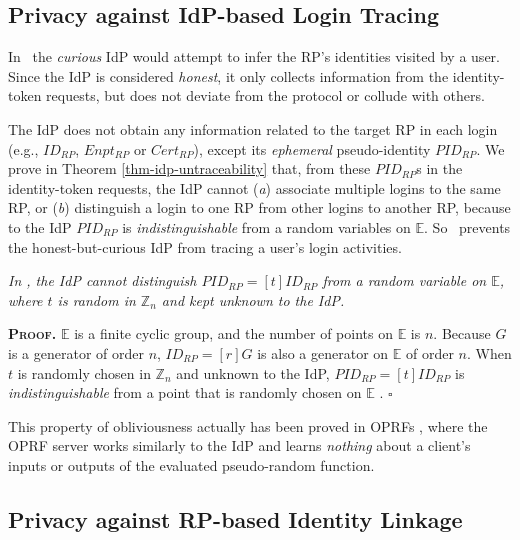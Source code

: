 \subsection{Privacy against IdP-based Login Tracing}
\label{subsec:IdP-privacy}

In \usso\ the \emph{curious} IdP would attempt to infer the RP's identities visited by a user. Since the IdP is considered \emph{honest}, it only collects information from the identity-token requests, 
 but does not deviate from the protocol or collude with others.

The IdP does not obtain any information related to the target RP in each login (e.g., $ID_{RP}$, $Enpt_{RP}$ or $Cert_{RP}$), except its \emph{ephemeral} pseudo-identity $PID_{RP}$.
We prove in Theorem \ref{thm-idp-untraceability} that, from these $PID_{RP}$s in the identity-token requests,
 the IdP cannot (\emph{a}) associate multiple logins to the same RP, or (\emph{b}) distinguish a login to one RP from other logins to another RP, because to the IdP $PID_{RP}$ is \emph{indistinguishable} from a random variables on $\mathbb{E}$. So \usso\ prevents the honest-but-curious IdP from tracing a user's login activities.

\vspace{-1mm}
\begin{thm}
\emph{In \usso, the IdP cannot distinguish $PID_{RP} = [t]ID_{RP}$ from a random variable on $\mathbb{E}$, where $t$ is random in $\mathbb{Z}_n$ and kept unknown to the IdP.}\label{thm-idp-untraceability}
\end{thm}
\vspace{-1mm}

\noindent\textbf{\textsc{Proof.}}
$\mathbb{E}$ is a finite cyclic group, and the number of points on $\mathbb{E}$ is $n$.
Because $G$ is a generator of order $n$, $ID_{RP} = [r]G$ is also a generator on $\mathbb{E}$ of order $n$.
When $t$ is randomly chosen in $\mathbb{Z}_n$ and unknown to the IdP, $PID_{RP} = [t]ID_{RP}$ is \emph{indistinguishable} from a point that is randomly chosen on $\mathbb{E}$ \cite{oprf-proved,voprf-proved}. \hfill $\square$
\vspace{1mm}

This property of obliviousness actually has been proved in OPRFs \cite{oprf-proved,voprf-proved}, where the OPRF server works similarly to the IdP and learns \emph{nothing} about a client's inputs or outputs of the evaluated pseudo-random function.

\subsection{Privacy against RP-based Identity Linkage}
\label{subsec:RP-privacy}

